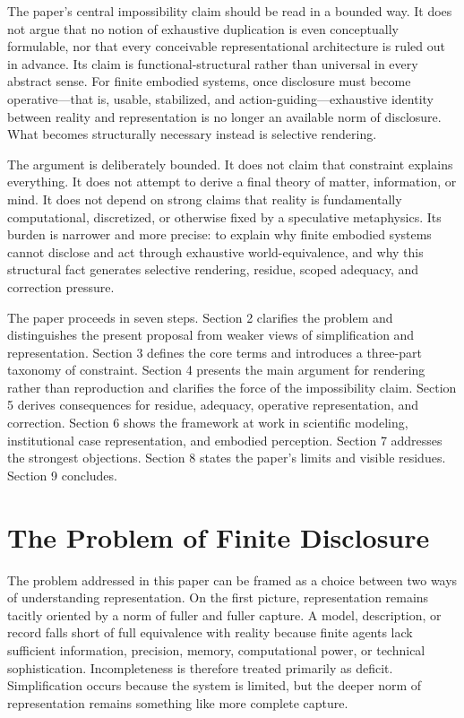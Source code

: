 \documentclass[11pt]{article}
\begin{document}
The paper's central impossibility claim should be read in a bounded way. It does not argue that no notion of exhaustive duplication is even conceptually formulable, nor that every conceivable representational architecture is ruled out in advance. Its claim is functional-structural rather than universal in every abstract sense. For finite embodied systems, once disclosure must become operative---that is, usable, stabilized, and action-guiding---exhaustive identity between reality and representation is no longer an available norm of disclosure. What becomes structurally necessary instead is selective rendering.

The argument is deliberately bounded. It does not claim that constraint explains everything. It does not attempt to derive a final theory of matter, information, or mind. It does not depend on strong claims that reality is fundamentally computational, discretized, or otherwise fixed by a speculative metaphysics. Its burden is narrower and more precise: to explain why finite embodied systems cannot disclose and act through exhaustive world-equivalence, and why this structural fact generates selective rendering, residue, scoped adequacy, and correction pressure.

The paper proceeds in seven steps. Section 2 clarifies the problem and distinguishes the present proposal from weaker views of simplification and representation. Section 3 defines the core terms and introduces a three-part taxonomy of constraint. Section 4 presents the main argument for rendering rather than reproduction and clarifies the force of the impossibility claim. Section 5 derives consequences for residue, adequacy, operative representation, and correction. Section 6 shows the framework at work in scientific modeling, institutional case representation, and embodied perception. Section 7 addresses the strongest objections. Section 8 states the paper's limits and visible residues. Section 9 concludes.
\section{The Problem of Finite Disclosure}

The problem addressed in this paper can be framed as a choice between two ways of understanding representation. On the first picture, representation remains tacitly oriented by a norm of fuller and fuller capture. A model, description, or record falls short of full equivalence with reality because finite agents lack sufficient information, precision, memory, computational power, or technical sophistication. Incompleteness is therefore treated primarily as deficit. Simplification occurs because the system is limited, but the deeper norm of representation remains something like more complete capture.
\end{document}
